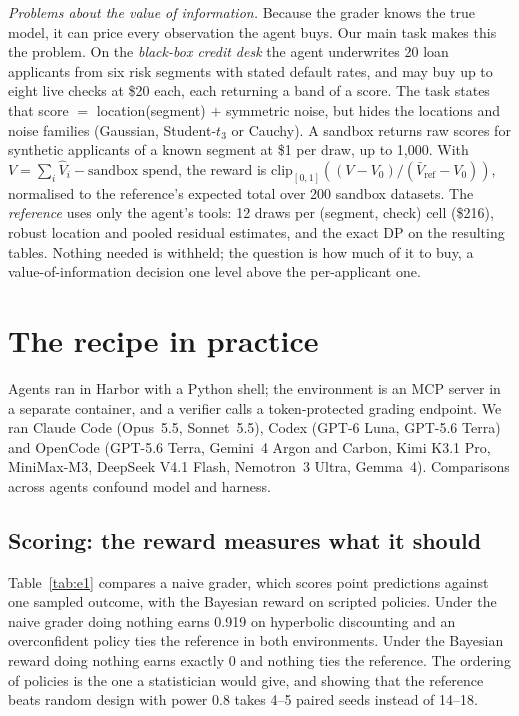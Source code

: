 \documentclass[10pt]{article}
\theoremstyle{definition}
\theoremstyle{remark}
\theoremstyle{plain}
\begin{document}
\emph{Problems about the value of information.} Because the grader knows the true model, it can
price every observation the agent buys. Our main task makes this the problem. On the
\emph{black-box credit desk} the agent underwrites 20 loan applicants from six risk segments with
stated default rates, and may buy up to eight live checks at \$20 each, each returning a band of
a score. The task states that score $=$ location(segment) $+$ symmetric noise, but hides the
locations and noise families (Gaussian, Student-$t_3$ or Cauchy). A sandbox returns raw scores
for synthetic applicants of a known segment at \$1 per draw, up to 1{,}000. With
$V = \sum_i \hat V_i - \text{sandbox spend}$, the reward is
$\mathrm{clip}_{[0,1]}((V - V_0)/(\bar V_\mathrm{ref} - V_0))$, normalised to the reference's
expected total over 200 sandbox datasets. The \emph{reference} uses only the agent's tools: 12
draws per (segment, check) cell (\$216), robust location and pooled residual estimates, and the
exact DP on the resulting tables. Nothing needed is withheld; the question is how much of it to
buy, a value-of-information decision one level above the per-applicant one.

\section{The recipe in practice}
\label{sec:results}

Agents ran in Harbor with a Python shell; the environment is an MCP server in a separate
container, and a verifier calls a token-protected grading endpoint. We ran Claude Code (Opus~5.5,
Sonnet~5.5), Codex (GPT-6 Luna, GPT-5.6 Terra) and OpenCode (GPT-5.6 Terra, Gemini~4 Argon and Carbon,
Kimi K3.1 Pro, MiniMax-M3, DeepSeek V4.1 Flash, Nemotron~3 Ultra, Gemma~4). Comparisons across
agents confound model and harness.

\subsection{Scoring: the reward measures what it should}
\label{sec:scoring}

Table~\ref{tab:e1} compares a naive grader, which scores point predictions against one sampled
outcome, with the Bayesian reward on scripted policies. Under the naive grader doing nothing earns
0.919 on hyperbolic discounting and an overconfident policy ties the reference in both
environments. Under the Bayesian reward doing nothing earns exactly 0 and nothing ties the
reference. The ordering of policies is the one a statistician would give, and showing that the
reference beats random design with power 0.8 takes 4--5 paired seeds instead of 14--18.
\end{document}
